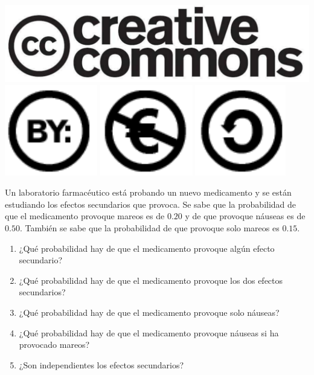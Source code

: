\documentclass[aspectratio=149,10pt,xcolor=dvipsnames,t]{beamer}
\begin{document}
\begin{frame}[c]
\begin{center}
		\biskip
		\includegraphics[scale=0.07]{../img/cc-logo}
		\includegraphics[scale=0.2]{../img/cc-by}
		\includegraphics[scale=0.2]{../img/cc-e}
		\includegraphics[scale=0.2]{../img/cc-c}
	\end{center}
\end{frame}
	
\begin{frame}[c]
	\large
	Un laboratorio farmacéutico está probando un nuevo medicamento y se están estudiando los efectos secundarios que
	provoca.
	Se sabe que la probabilidad de que el medicamento provoque mareos es de $0.20$ y de que provoque náuseas es de $0.50$. 
	También se sabe que la probabilidad de que provoque solo mareos es $0.15$.
	\begin{enumerate}
		\item ¿Qué probabilidad hay de que el medicamento provoque algún efecto secundario?
		\item ¿Qué probabilidad hay de que el medicamento provoque los dos efectos secundarios?
		\item ¿Qué probabilidad hay de que el medicamento provoque solo náuseas?
		\item ¿Qué probabilidad hay de que el medicamento provoque náuseas si ha provocado mareos?
		\item ¿Son independientes los efectos secundarios?
	\end{enumerate}
\end{frame}
	
\end{document}

